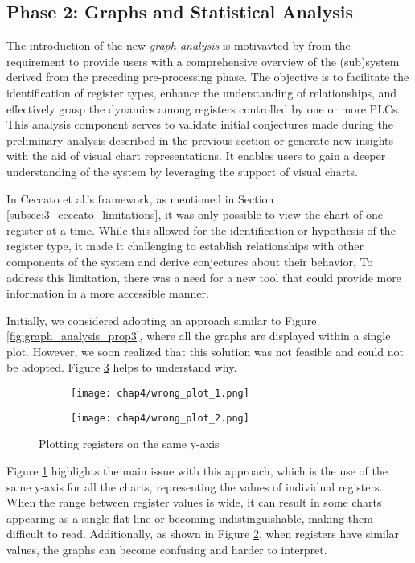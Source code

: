 \vfill

\subsection{Phase 2: Graphs and Statistical Analysis}
\label{subsec:4_improve_graphs}
The introduction of the new \textit{graph analysis} is motivavted by from the requirement to provide users with a comprehensive overview of the (sub)system derived from the preceding pre-processing phase. The objective is to facilitate the identification of register types, enhance the understanding of relationships, and effectively grasp the dynamics among registers controlled by one or more PLCs. This analysis component serves to validate initial conjectures made during the preliminary analysis described in the previous section or generate new insights with the aid of visual chart representations. It enables users to gain a deeper understanding of the system by leveraging the support of visual charts.

\bigskip
In Ceccato et al.'s framework, as mentioned in Section \ref{subsec:3_ceccato_limitations}, it was only possible to view the chart of one register at a time. While this allowed for the identification or hypothesis of the register type, it made it challenging to establish relationships with other components of the system and derive conjectures about their behavior. To address this limitation, there was a need for a new tool that could provide more information in a more accessible manner.

\bigskip
Initially, we considered adopting an approach similar to Figure \ref{fig:graph_analysis_prop3}, where all the graphs are displayed within a single plot. However, we soon realized that this solution was not feasible and could not be adopted. Figure \ref{fig:4_plot_comparison_1} helps to understand why.  

\begin{figure}[H]
	\centering
	\begin{subfigure}{0.48\textwidth}
		\texttt{[image: chap4/wrong\_plot\_1.png]}
		\caption{}
		\label{subfig:4_wrong_plot}
	\end{subfigure}
	\hfill
	\begin{subfigure}{0.48\textwidth}
		\texttt{[image: chap4/wrong\_plot\_2.png]}
		\caption{}
		\label{subfig:4_wrong_plot_zoom}
	\end{subfigure}
	\caption{Plotting registers on the same y-axis}
	\label{fig:4_plot_comparison_1}
\end{figure}
Figure \ref{subfig:4_wrong_plot} highlights the main issue with this approach, which is the use of the same y-axis for all the charts, representing the values of individual registers. When the range between register values is wide, it can result in some charts appearing as a single flat line or becoming indistinguishable, making them difficult to read. Additionally, as shown in Figure \ref{subfig:4_wrong_plot_zoom}, when registers have similar values, the graphs can become confusing and harder to interpret.

